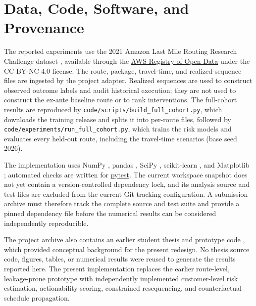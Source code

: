 \documentclass[11pt,a4paper]{article}
\begin{document}
\section*{Data, Code, Software, and Provenance}

The reported experiments use the 2021 Amazon Last Mile Routing Research Challenge dataset \cite{merchan2024}, available through the \href{https://registry.opendata.aws/amazon-last-mile-challenges/}{AWS Registry of Open Data} under the CC BY-NC 4.0 license. The route, package, travel-time, and realized-sequence files are ingested by the project adapter. Realized sequences are used to construct observed outcome labels and audit historical execution; they are not used to construct the ex-ante baseline route or to rank interventions. The full-cohort results are reproduced by \texttt{code/scripts/build\_full\_cohort.py}, which downloads the training release and splits it into per-route files, followed by \texttt{code/experiments/run\_full\_cohort.py}, which trains the risk models and evaluates every held-out route, including the travel-time scenarios (base seed 2026).

The implementation uses NumPy \cite{harris2020}, pandas \cite{mckinney2010}, SciPy \cite{virtanen2020}, scikit-learn \cite{pedregosa2011}, and Matplotlib \cite{hunter2007}; automated checks are written for \href{https://pytest.org}{pytest}. The current workspace snapshot does not yet contain a version-controlled dependency lock, and its analysis source and test files are excluded from the current Git tracking configuration. A submission archive must therefore track the complete source and test suite and provide a pinned dependency file before the numerical results can be considered independently reproducible.

The project archive also contains an earlier student thesis and prototype code \cite{hoang2026}, which provided conceptual background for the present redesign. No thesis source code, figures, tables, or numerical results were reused to generate the results reported here. The present implementation replaces the earlier route-level, leakage-prone prototype with independently implemented customer-level risk estimation, actionability scoring, constrained resequencing, and counterfactual schedule propagation.
\end{document}
